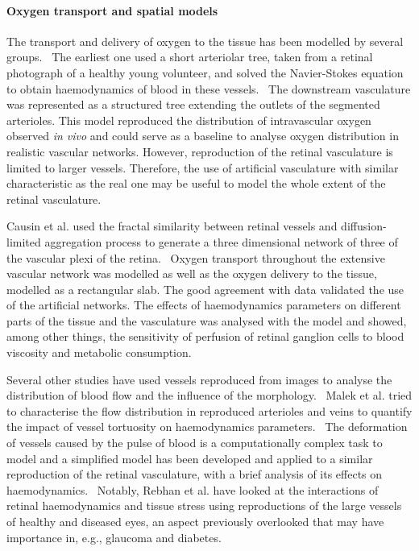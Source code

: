 \documentclass{article}
\begin{document}
\paragraph*{Oxygen transport and spatial models}

The transport and delivery of oxygen to the tissue has been modelled by several groups.~\cite{Aquah_2021,Causin_2015,Liu_2009}
The earliest one used a short arteriolar tree, taken from a retinal photograph of a healthy young volunteer, and solved the Navier-Stokes equation to obtain haemodynamics of blood in these vessels.~\cite{Liu_2009}
The downstream vasculature was represented as a structured tree extending the outlets of the segmented arterioles.
This model reproduced the distribution of intravascular oxygen observed \textit{in vivo} and could serve as a baseline to analyse oxygen distribution in realistic vascular networks.
However, reproduction of the retinal vasculature is limited to larger vessels.
Therefore, the use of artificial vasculature with similar characteristic as the real one may be useful to model the whole extent of the retinal vasculature.

Causin et al. used the fractal similarity between retinal vessels and diffusion-limited aggregation process to generate a three dimensional network of three of the vascular plexi of the retina.~\cite{Causin_2015}
Oxygen transport throughout the extensive vascular network was modelled as well as the oxygen delivery to the tissue, modelled as a rectangular slab.
The good agreement with data validated the use of the artificial networks.
The effects of haemodynamics parameters on different parts of the tissue and the vasculature was analysed with the model and showed, among other things, the sensitivity of perfusion of retinal ganglion cells to blood viscosity and metabolic consumption.~\cite{Causin_2015}


Several other studies have used vessels reproduced from images to analyse the distribution of blood flow and the influence of the morphology.~\cite{Malek_2014,Malek_2015,Rebhan_2019}
Malek et al. tried to characterise the flow distribution in reproduced arterioles and veins to quantify the impact of vessel tortuosity on haemodynamics parameters.~\cite{Malek_2014,Malek_2015}
The deformation of vessels caused by the pulse of blood is a computationally complex task to model and a simplified model has been developed and applied to a similar reproduction of the retinal vasculature, with a brief analysis of its effects on haemodynamics.~\cite{Aletti_2016}
Notably, Rebhan et al. have looked at the interactions of retinal haemodynamics and tissue stress using reproductions of the large vessels of healthy and diseased eyes, an aspect previously overlooked that may have importance in, e.g., glaucoma and diabetes.~\cite{Rebhan_2019}
\end{document}
